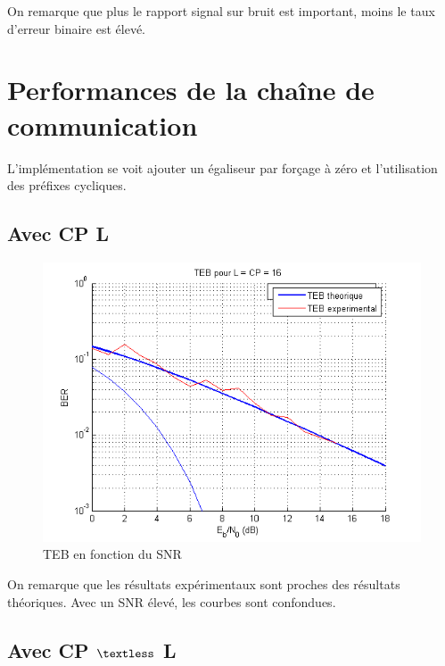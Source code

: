 \documentclass[11pt]{article}
\begin{document}
		On remarque que plus le rapport signal sur bruit est important, moins le taux d'erreur binaire est élevé.
	
	\section{Performances de la chaîne de communication}
	
	L'implémentation se voit ajouter un égaliseur par forçage à zéro et l'utilisation des préfixes cycliques.
	
		\subsection{Avec CP \geq L}
		
		\begin{figure}[H]
			\centering
			\includegraphics[scale=0.6]{img/teb1.jpg}
			\caption{TEB en fonction du SNR}
			\label{teb1}
		\end{figure}
		
		On remarque que les résultats expérimentaux sont proches des résultats théoriques. Avec un SNR élevé, les courbes sont confondues.
		
		\subsection{Avec CP $\textless$ L}
\end{document}
